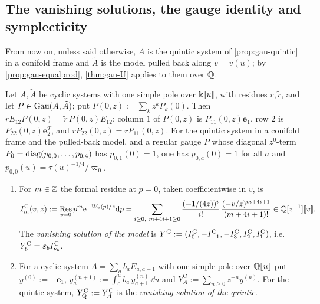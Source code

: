 
\subsection{The vanishing solutions, the gauge identity and symplecticity}
\label{sec:gau-van}

From now on, unless said otherwise, $A$ is the quintic system of \cref{prop:gau-quintic} in a conifold frame and $\tilde A$ is the model pulled back along $v=v(u)$; by \cref{prop:gau-equalprod}, \cref{thm:gau-U} applies to them over $\mathbb{Q}$.

\begin{lem}
\label{lem:gau-R1}
Let $A,\tilde A$ be cyclic systems with one simple pole over $\Bbbk[\![ u ]\!]$, with residues $r,\tilde r$, and let $P\in\operatorname{Gau}(A,\tilde A)$; put $P(0,z):=\sum_kz^kP_k(0)$. Then $rE_{12}P(0,z)=\tilde r\,P(0,z)E_{12}$: column $1$ of $P(0,z)$ is $P_{11}(0,z)\mathbf e_1$, row $2$ is $P_{22}(0,z)\mathbf e_2^T$, and $rP_{22}(0,z)=\tilde rP_{11}(0,z)$. For the quintic system in a conifold frame and the pulled-back model, and a regular gauge $P$ whose diagonal $z^0$-term $P_0=\operatorname{diag}(p_{0,0},\dots,p_{0,4})$ has $p_{0,1}(0)=1$, one has $p_{0,a}(0)=1$ for all $a$ and $p_{0,0}(u)=\tau(u)^{-1/4}/\varpi_0$.
\end{lem}

\begin{defn}
\label{def:gau-van}
\begin{enumerate}
\item For $m\in\mathbb{Z}$ the formal residue at $p=0$, taken coefficientwise in $v$, is
\[
\IC_m(v,z):=\Res_{p=0}p^m\re^{-\Wv(p)/z}\dd p=\sum_{i\geq0,\ m+4i+1\geq0}\frac{(-1/(4z))^i}{i!}\,\frac{(-v/z)^{m+4i+1}}{(m+4i+1)!}\in\bbQ[z^{-1}]\fps v .
\]
The \emph{vanishing solution of the model} is $Y^{\mathrm{C}}:=(I^{\mathrm{C}}_0,-I^{\mathrm{C}}_{-1},-I^{\mathrm{C}}_3,I^{\mathrm{C}}_2,I^{\mathrm{C}}_1)$, i.e.\ $Y^{\mathrm{C}}_b=\varepsilon_bI^{\mathrm{C}}_{\nu_b}$.
\item For a cyclic system $A=\sum_ab_aE_{a,a+1}$ with one simple pole over $\mathbb{Q}[\![ u ]\!]$ put $y^{(0)}:=-\mathbf e_1$, $y^{(n+1)}_a:=\int_0^ub_a\,y^{(n)}_{a+1}\,\dd u$ and $Y^{\mathrm C}_A:=\sum_{n\geq0}z^{-n}y^{(n)}$. For the quintic system, $Y^{\mathrm{C}}_{\mathrm{Q}}:=Y^{\mathrm C}_A$ is the \emph{vanishing solution of the quintic}.
\end{enumerate}
\end{defn}

